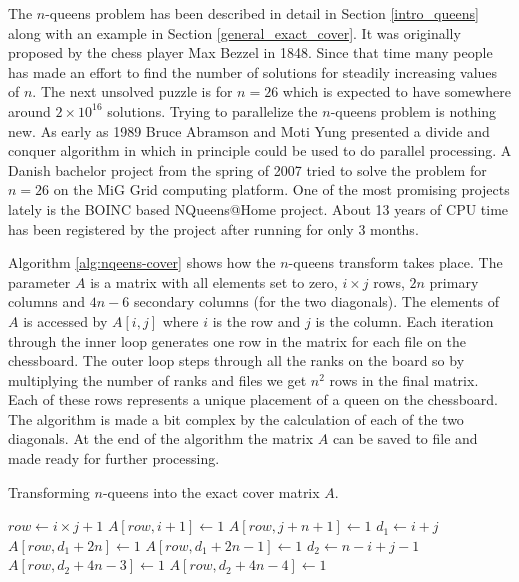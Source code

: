 The $n$-queens problem has been described in detail in Section \ref{intro_queens} along with an example in Section \ref{general_exact_cover}.
It was originally proposed by the chess player Max Bezzel in 1848.
Since that time many people has made an effort to find the number of solutions for steadily increasing values of $n$.
The next unsolved puzzle is for $n = 26$ which is expected to have somewhere around $2 \times 10^{16}$ solutions.
Trying to parallelize the $n$-queens problem is nothing new.
As early as 1989 Bruce Abramson and Moti Yung presented a divide and conquer algorithm in \cite{Abramson89} which in principle could be used to do parallel processing.
A Danish bachelor project from the spring of 2007 \cite{queens-mig} tried to solve the problem for $n=26$ on the MiG \cite{mig} Grid computing platform.
One of the most promising projects lately is the BOINC based NQueens@Home \cite{nqueensathome} project.
About 13 years of CPU time has been registered by the project after running for only 3 months.

Algorithm \ref{alg:nqeens-cover} shows how the $n$-queens transform takes place.
The parameter $A$ is a matrix with all elements set to zero, $i \times j$ rows, $2n$ primary columns and $4n - 6$ secondary columns (for the two diagonals).
The elements of $A$ is accessed by $A[i,j]$ where $i$ is the row and $j$ is the column.
Each iteration through the inner loop generates one row in the matrix for each file on the chessboard.
The outer loop steps through all the ranks on the board so by multiplying the number of ranks and files we get $n^2$ rows in the final matrix.
Each of these rows represents a unique placement of a queen on the chessboard.
The algorithm is made a bit complex by the calculation of each of the two diagonals.
At the end of the algorithm the matrix $A$ can be saved to file and made ready for further processing.

\begin{algorithm}[H]
	\caption{Transforming $n$-queens into the exact cover matrix $A$.}
	\label{alg:nqeens-cover}
	\begin{distribalgo}[1]
					\STATE $row \leftarrow i \times j + 1$
					\STATE $A[row,i+1] \leftarrow 1$  
					\STATE $A[row,j+n+1] \leftarrow 1$  
					\STATE $d_1 \leftarrow i + j$  
							\STATE $A[row,d_1 + 2n] \leftarrow 1$
						\ELSE
							\STATE $A[row,d_1 + 2n - 1] \leftarrow 1$
						\ENDIF
					\ENDIF
					\STATE $d_2 \leftarrow n - i + j - 1$  
							\STATE $A[row,d_2 + 4n - 3] \leftarrow 1$
						\ELSE
							\STATE $A[row,d_2 + 4n - 4] \leftarrow 1$
						\ENDIF
					\ENDIF
				\ENDFOR
			\ENDFOR
		\ENDPROC
	\end{distribalgo}
\end{algorithm}

